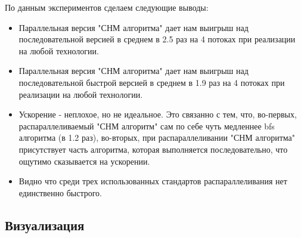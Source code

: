 \documentclass{report}
\begin{document}

\par По данным экспериментов сделаем следующие выводы:
\begin{itemize}
    \item Параллельная версия "СНМ алгоритма" дает нам выигрыш над последовательной версией в среднем в 2.5 раз на 4 потоках при реализации на любой технологии.
    \item Параллельная версия "СНМ алгоритма" дает нам выигрыш над последовательной быстрой версией в среднем в 1.9 раз на 4 потоках при реализации на любой технологии.
    \item Ускорение - неплохое, но не идеальное. Это связанно с тем, что, во-первых, распараллеливаемый "СНМ алгоритм" сам по себе чуть медленнее bfs алгоритма (в 1.2 раз), во-вторых, при распараллеливании "СНМ алгоритма" присутствует часть алгоритма, которая выполняется последовательно, что ощутимо сказывается на ускорении.
    \item Видно что среди трех использованных стандартов распараллеливания нет единственно быстрого.
\end{itemize}
\subsection*{Визуализация}
\end{document}
